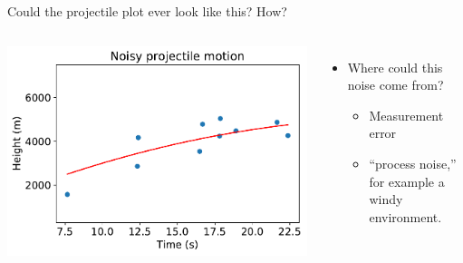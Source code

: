 \documentclass[aspectratio=169]{beamer}
\begin{document}
\begin{frame}{Could the projectile plot ever look like this?  How?}

\begin{columns}

\includegraphics[scale=0.5]{data/Huang_et_al/projectile_noise.pdf}


\pause

\begin{itemize}
\item Where could this noise come from?
\begin{itemize}
\item Measurement error
\item ``process noise,'' for example a windy environment.
\end{itemize}
\end{itemize}
\end{columns}

\end{frame}
\end{document}
